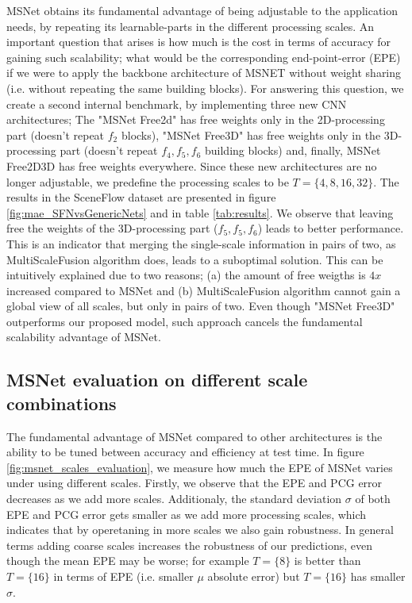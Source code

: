 \documentclass[runningheads]{llncs}
\begin{document}
MSNet obtains its fundamental advantage of being adjustable to the application needs, by repeating its learnable-parts in the different processing scales. An important question that arises is how much is the cost in terms of accuracy for gaining such scalability; what would be the corresponding end-point-error (EPE) if we were to apply the backbone architecture of MSNET without weight sharing (i.e. without repeating the same building blocks). For answering this question, we create a second internal benchmark, by implementing three new CNN architectures; The "MSNet Free2d" has free weights only in the 2D-processing part (doesn't repeat $f_2$ blocks), "MSNet Free3D" has free weights only in the 3D-processing part (doesn't repeat $f_4, f_5, f_6$ building blocks) and, finally, MSNet Free2D3D has free weights everywhere. Since these new architectures are no longer adjustable, we predefine the processing scales to be $T = \{4, 8, 16, 32\}$. The results in the SceneFlow dataset are presented in figure \ref{fig:mae_SFNvsGenericNets} and in table \ref{tab:results}. We observe that leaving free the weights of the 3D-processing part ($f_5, f_5, f_6$) leads to better performance. This is an indicator that merging the single-scale information in pairs of two, as MultiScaleFusion algorithm does, leads to a suboptimal solution. This can be intuitively explained due to two reasons; (a) the amount of free weigths is $4x$ increased compared to MSNet and (b) MultiScaleFusion algorithm cannot gain a global view of all scales, but only in pairs of two. Even though "MSNet Free3D" outperforms our proposed model, such approach cancels the fundamental scalability advantage of MSNet.

\subsection{MSNet evaluation on different scale combinations}

The fundamental advantage of MSNet compared to other architectures is the ability to be tuned between accuracy and efficiency at test time. In figure \ref{fig:msnet_scales_evaluation}, we measure how much the EPE of MSNet varies under using different scales. Firstly, we observe that the EPE and PCG error decreases as we add more scales. Additionaly, the standard deviation $\sigma$ of both EPE and PCG error gets smaller as we add more processing scales, which indicates that by operetaning in more scales we also gain robustness. In general terms adding coarse scales increases the robustness of our predictions, even though the mean EPE may be worse; for example $T=\{ 8 \}$ is better than $ T = \{ 16 \}$ in terms of EPE (i.e. smaller $\mu$ absolute error) but $ T = \{ 16 \}$ has smaller $\sigma$.
\end{document}
